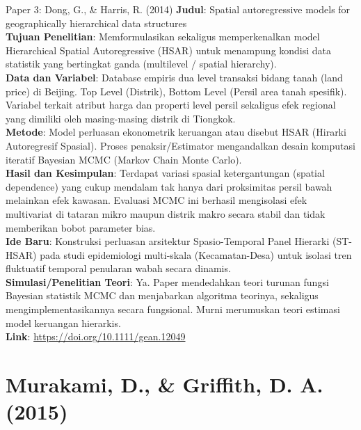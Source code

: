 \documentclass{beamer}
\begin{document}
\begin{frame}[allowframebreaks]{Paper 3: Dong, G., \& Harris, R. (2014)}
    \textbf{Judul}: Spatial autoregressive models for geographically hierarchical data structures \\
    \textbf{Tujuan Penelitian}: Memformulasikan sekaligus memperkenalkan model Hierarchical Spatial Autoregressive (HSAR) untuk menampung kondisi data statistik yang bertingkat ganda (multilevel / spatial hierarchy). \\
    \vspace{0.3cm}
    \textbf{Data dan Variabel}: Database empiris dua level transaksi bidang tanah (land price) di Beijing. Top Level (Distrik), Bottom Level (Persil area tanah spesifik). Variabel terkait atribut harga dan properti level persil sekaligus efek regional yang dimiliki oleh masing-masing distrik di Tiongkok. \\
    \vspace{0.3cm}
    \textbf{Metode}: Model perluasan ekonometrik keruangan atau disebut HSAR (Hirarki Autoregresif Spasial). Proses penaksir/Estimator mengandalkan desain komputasi iteratif Bayesian MCMC (Markov Chain Monte Carlo). \\
    \framebreak
    \textbf{Hasil dan Kesimpulan}: Terdapat variasi spasial ketergantungan (spatial dependence) yang cukup mendalam tak hanya dari proksimitas persil bawah melainkan efek kawasan. Evaluasi MCMC ini berhasil mengisolasi efek multivariat di tataran mikro maupun distrik makro secara stabil dan tidak memberikan bobot parameter bias. \\
    \vspace{0.3cm}
    \textbf{Ide Baru}: Konstruksi perluasan arsitektur Spasio-Temporal Panel Hierarki (ST-HSAR) pada studi epidemiologi multi-skala (Kecamatan-Desa) untuk isolasi tren fluktuatif temporal penularan wabah secara dinamis. \\
    \vspace{0.3cm}
    \textbf{Simulasi/Penelitian Teori}: Ya. Paper mendedahkan teori turunan fungsi Bayesian statistik MCMC dan menjabarkan algoritma teorinya, sekaligus mengimplementasikannya secara fungsional. Murni merumuskan teori estimasi model keruangan hierarkis. \\
    \vspace{0.3cm}
    \textbf{Link}: \url{https://doi.org/10.1111/gean.12049}
\end{frame}

\section{Murakami, D., \& Griffith, D. A. (2015)}
\end{document}
